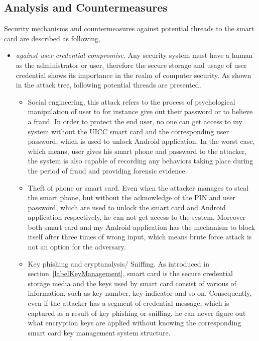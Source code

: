 \subsection{Analysis and Countermeasures}
Security mechanisms and countermeasures against potential threads to the smart card are described as following,
\begin{itemize}
\item \emph{against user credential compromise}. Any security system must have a human as the administrator or user, therefore the secure storage and usage of user credential shows its importance in the realm of computer security. As shown in the attack tree, following potential threads are presented,
\begin{itemize}
\item Social engineering, this attack refers to the process of psychological manipulation of user to for instance give out their password or to believe a fraud. In order to protect the end user, no one can get access to my system without the UICC smart card and the corresponding user password, which is used to unlock Android  application. In the worst case, which means, user gives his smart phone and password to the attacker, the system is also capable of recording any behaviors taking place during the period of fraud and providing forensic evidence.
\item Theft of phone or smart card. Even when the attacker manages to steal the smart phone, but without the acknowledge of the PIN and user password, which are used to unlock the smart card and Android application respectively, he can not get access to the system. Moreover both smart card and my Android application has the mechanism to block itself after three times of wrong input, which means brute force attack is not an option for the adversary.
\item Key phishing and cryptanalysis/ Sniffing. As introduced in section~\ref{labelKeyManagement}, smart card is the secure  credential  storage media and the keys used by smart card consist of various of information, such as key number, key indicator and so on. Consequently, even if the attacker has a segment of credential message, which is captured as a result of key phishing or sniffing, he can never figure out what encryption keys are applied without knowing the corresponding smart card key management system structure.
\end{itemize}

\end{itemize}
